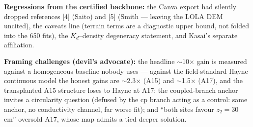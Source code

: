 \documentclass[11pt]{article}
\begin{document}
\textbf{Regressions from the certified backbone:} the Canva export had
silently dropped references [4] (Saito) and [5] (Smith --- leaving the LOLA
DEM uncited), the caveats line (terrain terms are a diagnostic upper bound,
not folded into the 650 fits), the $K_d$--density degeneracy statement, and
Kasai's separate affiliation.

\textbf{Framing challenges (devil's advocate):} the headline
$\sim$10$\times$ gain is measured against a homogeneous baseline nobody
uses --- against the field-standard Hayne continuous model the honest gains
are $\sim$2.3$\times$ (A15) and $\sim$1.5$\times$ (A17), and the
transplanted A15 structure loses to Hayne at A17; the coupled-branch anchor
invites a circularity question (defused by the cp branch acting as a
control: same anchor, no conductivity channel, far worse fit); and ``both
sites favour $z_2=30$ cm'' oversold A17, whose map admits a tied deeper
solution.
\end{document}
